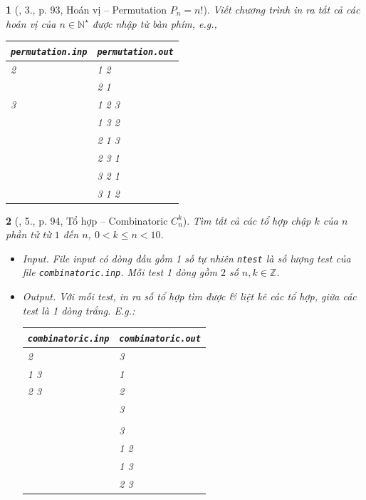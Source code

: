 \documentclass{article}
\newtheorem{baitoan}{}
\begin{document}
\begin{baitoan}[\cite{VietSTEM2021}, 3., p. 93, Hoán vị -- Permutation $P_n = n!$]
	Viết chương trình in ra tất cả các hoán vị của $n\in\mathbb{N}^\star$ được nhập từ bàn phím, e.g.,
	\begin{table}[H]
		\centering
		\begin{tabular}{|l|l|}
			\hline
			{\tt permutation.inp} & {\tt permutation.out} \\
			\hline
			2 & 1 2 \\
			& 2 1 \\
			\hline
			3 & 1 2 3 \\
			& 1 3 2 \\
			& 2 1 3 \\
			& 2 3 1 \\
			& 3 2 1 \\
			& 3 1 2 \\
			\hline
		\end{tabular}
	\end{table}
\end{baitoan}

\begin{baitoan}[\cite{VietSTEM2021}, 5., p. 94, Tổ hợp -- Combinatoric $C_n^k$]
	Tìm tất cả các tổ hợp chập $k$ của $n$ phần tử từ $1$ đến $n$, $0 < k\le n < 10$.
	\begin{itemize}
		\item {\sf Input.} File input có dòng đầu gồm 1 số tự nhiên {\tt ntest} là số lượng test của file \verb|combinatoric.inp|. Mỗi test 1 dòng gồm $2$ số $n,k\in\mathbb{Z}$. 
		\item {\sf Output.} Với mỗi test, in ra số tổ hợp tìm được \& liệt kê các tổ hợp, giữa các test là 1 dòng trắng. E.g.:
		\begin{table}[H]
			\centering
			\begin{tabular}{|l|l|}
				\hline
				{\tt combinatoric.inp} & {\tt combinatoric.out} \\
				\hline
				2 & 3 \\
				1 3 & 1 \\
				2 3 & 2 \\
				& 3 \\
				& \\
				& 3 \\
				& 1 2 \\
				& 1 3 \\
				& 2 3 \\
				\hline
			\end{tabular}
		\end{table}
	\end{itemize}
\end{baitoan}
\end{document}
